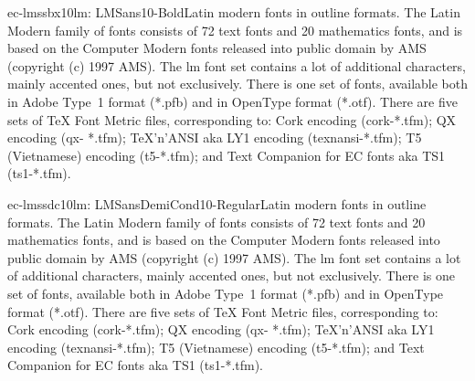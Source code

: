 \documentclass{ddltxtyp}
\begin{document}
\begin{package}{ec-lmssbx10}{lm: LMSans10-Bold}{Latin modern fonts in outline formats.}
The Latin Modern family of fonts consists of 72 text fonts and
20 mathematics fonts, and is based on the Computer Modern fonts
released into public domain by AMS (copyright (c) 1997 AMS).
The lm font set contains a lot of additional characters, mainly
accented ones, but not exclusively. There is one set of fonts,
available both in Adobe Type~1 format (*.pfb) and in OpenType
format (*.otf). There are five sets of {\TeX} Font Metric files,
corresponding to: Cork encoding (cork-*.tfm); QX encoding (qx-
*.tfm); {\TeX}'n'ANSI aka LY1 encoding (texnansi-*.tfm); T5
(Vietnamese) encoding (t5-*.tfm); and Text Companion for EC
fonts aka TS1 (ts1-*.tfm).
\end{package}
\begin{package}{ec-lmssdc10}{lm: LMSansDemiCond10-Regular}{Latin modern fonts in outline formats.}
The Latin Modern family of fonts consists of 72 text fonts and
20 mathematics fonts, and is based on the Computer Modern fonts
released into public domain by AMS (copyright (c) 1997 AMS).
The lm font set contains a lot of additional characters, mainly
accented ones, but not exclusively. There is one set of fonts,
available both in Adobe Type~1 format (*.pfb) and in OpenType
format (*.otf). There are five sets of {\TeX} Font Metric files,
corresponding to: Cork encoding (cork-*.tfm); QX encoding (qx-
*.tfm); {\TeX}'n'ANSI aka LY1 encoding (texnansi-*.tfm); T5
(Vietnamese) encoding (t5-*.tfm); and Text Companion for EC
fonts aka TS1 (ts1-*.tfm).
\end{package}
\end{document}
